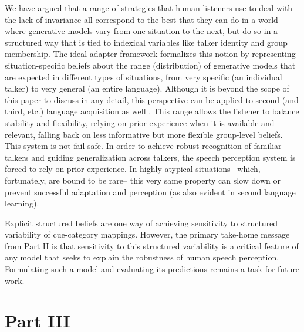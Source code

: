 We have argued that a range of strategies that human listeners use to deal with the lack of invariance all correspond to the best that they can do in a world where generative models vary from one situation to the next, but do so in a structured way that is tied to indexical variables like talker identity and group membership.  The ideal adapter framework formalizes this notion by representing situation-specific beliefs about the range (distribution) of generative models that are expected in different types of situations, from very specific (an individual talker) to very general (an entire language).%
Although it is beyond the scope of this paper to discuss in any detail, this perspective can be applied to second (and third, etc.) language acquisition as well \autocite{Pajak2016}.
This range allows the listener to balance stability and flexibility, relying on prior experience when it is available and relevant, falling back on less informative but more flexible group-level beliefs. This system is not fail-safe. In order to achieve robust recognition of familiar talkers and guiding generalization across talkers, the speech perception system is forced to rely on prior experience. In highly atypical situations --which, fortunately, are bound to be rare-- this very same property can slow down or prevent successful adaptation and perception (as also evident in second language learning). 

Explicit structured beliefs are one way of achieving sensitivity to structured variability of cue-category mappings. However, the primary take-home message from Part II is that sensitivity to this structured variability is a critical feature of any model that seeks to explain the robustness of human speech perception.  Formulating such a model and evaluating its predictions remains a task for future work.


\section{Part III}
\label{sec:part-iii}

